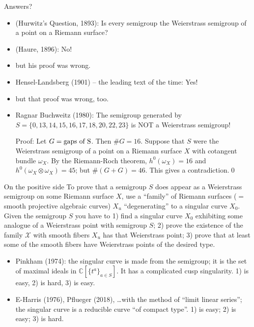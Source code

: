 \documentclass[12pt, aspectratio=169]{beamer}
\def\C{{\mathbb C}}
\begin{document}
\begin{frame}{Answers?}
 
\begin{itemize}
 \item<1-6> (Hurwitz's Question, 1893):\alert{ Is every semigroup the Weierstrass semigroup of a point
on a Riemann surface?}
\item <2-6> \qquad (Haure, 1896): No!
\item<3-6> \qquad\qquad but his proof was wrong.
\item<4-6> \qquad Hensel-Landsberg (1901) -- the leading text of the time: Yes!
\item<5-6> \qquad\qquad but that proof was wrong, too.
\item<6> \qquad \alert{Ragnar Buchweitz} (1980): The semigroup generated by
$S = \{0, 13, 14, 15, 16, 17, 18, 20, 22, 23\} $ is NOT a Weierstrass semigroup! 
\smallskip

\alert{Proof:} Let $G= \hbox{gaps of S}$. Then $\#G = 16$. Suppose that $S$ were the Weierstrass semigroup
of a point on a Riemann surface $X$ with cotangent bundle $\omega_X$. By the Riemann-Roch theorem,
$h^0(\omega_X) = 16$ and $h^0(\omega_X\otimes \omega_X) = 45$; but $\#(G+G) = 46$. This gives a  contradiction.\qed
\end{itemize}
\end{frame}

\begin{frame}{On the positive side}
To prove that a semigroup $S$ does appear as a Weierstrass semigroup on some
Riemann surface $X$, use a ``family'' of
Riemann surfaces  ($=$ smooth projective algebraic curves) $X_u$ ``degenerating'' to a singular curve $X_0$.
 Given the semigroup $S$ you
have to 1) find a singular curve $X_0$ exhibiting some analogue of a Weierstrass point with semigroup $S$;
2) prove the existence of the family $\mathcal X$ with smooth fibers $X_u$ has that Weierstrass point;
3) prove that at least some of the smooth fibers have Weierstrass points of the desired type.

\begin{itemize}
 \item Pinkham (1974): the singular curve is made from the semigroup; it is the set 
of maximal ideals in $\C[\{t^a\}_{a\in S}]$. It has a complicated cusp singularity. 1) is easy, 2) is hard, 3) is easy.

\item E-Harris (1976), Pflueger (2018), \dots with the method of ``limit linear series''; the singular curve is a reducible curve ``of compact type''. 1) is easy; 2) is easy; 3) is hard.
\end{itemize}
\end{frame}
\end{document}
